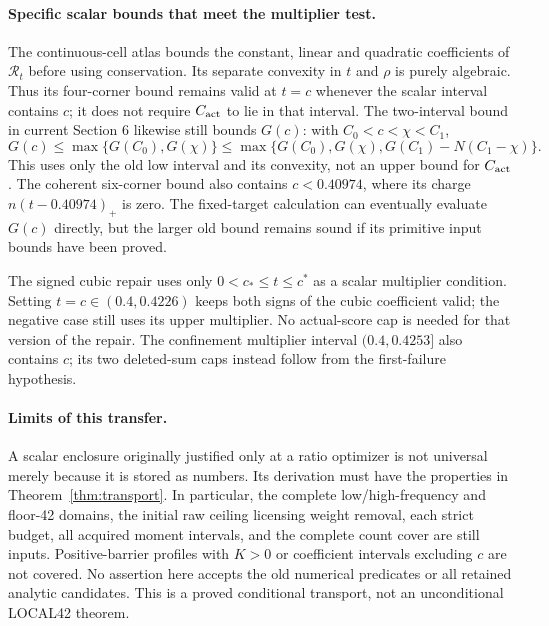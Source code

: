 \paragraph{Specific scalar bounds that meet the multiplier test.}
The continuous-cell atlas bounds the constant, linear and quadratic
coefficients of $\mathcal R_t$ before using conservation. Its separate
convexity in $t$ and $\rho$ is purely algebraic. Thus its four-corner
bound remains valid at $t=c$ whenever the scalar interval contains $c$;
it does not require $C_{\rm act}$ to lie in that interval.
The two-interval bound in current Section 6 likewise still bounds
$G(c)$: with $C_0<c<\chi<C_1$,
\[
 G(c)\le\max\{G(C_0),G(\chi)\}
 \le\max\{G(C_0),G(\chi),G(C_1)-N(C_1-\chi)\}.
\]
This uses only the old low interval and its convexity, not an upper
bound for $C_{\rm act}$. The coherent six-corner bound also contains
$c<0.40974$, where its charge $n(t-0.40974)_+$ is zero. The fixed-target
calculation can eventually evaluate $G(c)$ directly, but the larger old
bound remains sound if its primitive input bounds have been proved.

The signed cubic repair uses only $0<c_*\le t\le c^*$ as a scalar
multiplier condition. Setting $t=c\in(0.4,0.4226)$ keeps both signs of
the cubic coefficient valid; the negative case still uses its upper
multiplier. No actual-score cap is needed for that version of the repair.
The confinement multiplier interval $(0.4,0.4253]$ also contains $c$;
its two deleted-sum caps instead follow from the first-failure hypothesis.

\paragraph{Limits of this transfer.}
A scalar enclosure originally justified only at a ratio optimizer is
not universal merely because it is stored as numbers. Its derivation
must have the properties in Theorem~\ref{thm:transport}. In particular,
the complete low/high-frequency and floor-42 domains, the initial raw
ceiling licensing weight removal, each strict budget, all acquired
moment intervals, and the complete count cover are still inputs.
Positive-barrier profiles with $K>0$ or coefficient intervals excluding
$c$ are not covered. No assertion here accepts the old numerical
predicates or all retained analytic candidates. This is a proved
conditional transport, not an unconditional LOCAL42 theorem.

